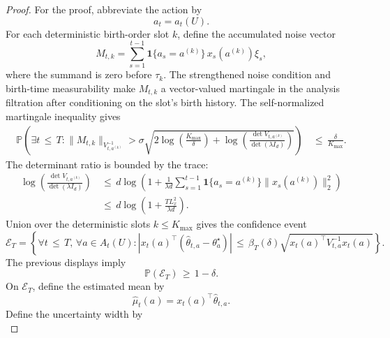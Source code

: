 \documentclass{article} %
\begin{document}
\begin{proof}
For the proof, abbreviate the action by
\begin{equation}
\label{eq:app-prop-action-short}
a_t
=
a_t(U).
\end{equation}
For each deterministic birth-order slot \(k\), define the accumulated noise vector
\begin{equation}
\label{eq:app-prop-noise-vector}
M_{t,k}
=
\sum_{s=1}^{t-1}
\mathbf{1}\{a_s=a^{(k)}\}\,x_s(a^{(k)})\xi_s,
\end{equation}
where the summand is zero before $\tau_k$. The strengthened noise condition and
birth-time measurability make \(M_{t,k}\) a vector-valued martingale in the
analysis filtration after conditioning on the slot's birth history. The
self-normalized martingale inequality gives
\begin{align}
\label{eq:app-self-normalized}
\mathbb{P}\!\left(
\exists t\,\le\, T:
\|M_{t,k}\|_{V_{t,a^{(k)}}^{-1}}
>
\sigma
\sqrt{
2\log\!\left(\frac{K_{\max}}{\delta}\right)
+
\log\!\left(\frac{\det V_{t,a^{(k)}}}{\det(\lambda I_d)}\right)
}
\right)
&\,\le\,
\frac{\delta}{K_{\max}}.
\end{align}
The determinant ratio is bounded by the trace:
\begin{align}
\label{eq:app-det-bound}
\log\!\left(\frac{\det V_{t,a^{(k)}}}{\det(\lambda I_d)}\right)
&\,\le\,
d\log\!\left(
1+
\frac{1}{\lambda d}
\sum_{s=1}^{t-1}
\mathbf{1}\{a_s=a^{(k)}\}\|x_s(a^{(k)})\|_2^2
\right)
\\
&\,\le\,
d\log\!\left(
1+\frac{T L_x^2}{\lambda d}
\right).
\end{align}
Union over the deterministic slots \(k\le K_{\max}\) gives the confidence event
\begin{equation}
\label{eq:app-confidence-event}
\mathcal{E}_T
=
\left\{
\forall t\,\le\, T,\,
\forall a\in A_t(U):
\left|
x_t(a)^\top(\widehat{\theta}_{t,a}-\theta_a^\star)
\right|
\,\le\,
\beta_T(\delta)
\sqrt{x_t(a)^\top V_{t,a}^{-1}x_t(a)}
\right\}.
\end{equation}
The previous displays imply
\begin{equation}
\label{eq:app-confidence-prob}
\mathbb{P}(\mathcal{E}_T)
\,\ge\,
1-\delta.
\end{equation}
On \(\mathcal{E}_T\), define the estimated mean by
\begin{equation}
\label{eq:app-estimated-mean}
\widehat{\mu}_t(a)
=
x_t(a)^\top\widehat{\theta}_{t,a}.
\end{equation}
Define the uncertainty width by
\begin{equation}

\end{equation}
\end{proof}
\end{document}
